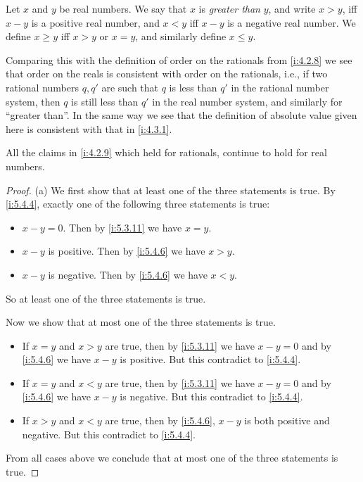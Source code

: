 \begin{defn}\label{i:5.4.6}
  Let \(x\) and \(y\) be real numbers.
  We say that \(x\) is \emph{greater than} \(y\), and write \(x > y\), iff \(x - y\) is a positive real number, and \(x < y\) iff \(x - y\) is a negative real number.
  We define \(x \geq y\) iff \(x > y\) or \(x = y\), and similarly define \(x \leq y\).
\end{defn}

\begin{note}
  Comparing this with the definition of order on the rationals from \cref{i:4.2.8} we see that order on the reals is consistent with order on the rationals, i.e., if two rational numbers \(q, q'\) are such that \(q\) is less than \(q'\) in the rational number system, then \(q\) is still less than \(q'\) in the real number system, and similarly for ``greater than''.
  In the same way we see that the definition of absolute value given here is consistent with that in \cref{i:4.3.1}.
\end{note}

\begin{prop}\label{i:5.4.7}
  All the claims in \cref{i:4.2.9} which held for rationals, continue to hold for real numbers.
\end{prop}

\begin{proof}{(a)}
  We first show that at least one of the three statements is true.
  By \cref{i:5.4.4}, exactly one of the following three statements is true:
  \begin{itemize}
    \item \(x - y = 0\).
          Then by \cref{i:5.3.11} we have \(x = y\).
    \item \(x - y\) is positive.
          Then by \cref{i:5.4.6} we have \(x > y\).
    \item \(x - y\) is negative.
          Then by \cref{i:5.4.6} we have \(x < y\).
  \end{itemize}
  So at least one of the three statements is true.

  Now we show that at most one of the three statements is true.
  \begin{itemize}
    \item If \(x = y\) and \(x > y\) are true, then by \cref{i:5.3.11} we have \(x - y = 0\) and by \cref{i:5.4.6} we have \(x - y\) is positive.
          But this contradict to \cref{i:5.4.4}.
    \item If \(x = y\) and \(x < y\) are true, then by \cref{i:5.3.11} we have \(x - y = 0\) and by \cref{i:5.4.6} we have \(x - y\) is negative.
          But this contradict to \cref{i:5.4.4}.
    \item If \(x > y\) and \(x < y\) are true, then by \cref{i:5.4.6}, \(x - y\) is both positive and negative.
          But this contradict to \cref{i:5.4.4}.
  \end{itemize}
  From all cases above we conclude that at most one of the three statements is true.
\end{proof}

